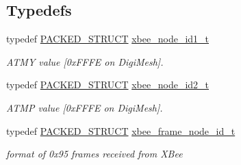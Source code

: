\subsection*{Typedefs}
\begin{DoxyCompactItemize}
\item 
typedef \hyperlink{group___s_x_a_ga4233297bd31be5c273d4fb0758cc54d7}{P\+A\+C\+K\+E\+D\+\_\+\+S\+T\+R\+U\+CT} \hyperlink{group__xbee__discovery_gaf00a7a98eff47e084bf5f8741bf41220}{xbee\+\_\+node\+\_\+id1\+\_\+t}
\begin{DoxyCompactList}\small\item\em A\+T\+MY value \mbox{[}0x\+F\+F\+FE on Digi\+Mesh\mbox{]}. \end{DoxyCompactList}\item 
typedef \hyperlink{group___s_x_a_ga4233297bd31be5c273d4fb0758cc54d7}{P\+A\+C\+K\+E\+D\+\_\+\+S\+T\+R\+U\+CT} \hyperlink{group__xbee__discovery_ga4c7c2f1049e4dc4bb4552269077cf4fc}{xbee\+\_\+node\+\_\+id2\+\_\+t}
\begin{DoxyCompactList}\small\item\em A\+T\+MP value \mbox{[}0x\+F\+F\+FE on Digi\+Mesh\mbox{]}. \end{DoxyCompactList}\item 
typedef \hyperlink{group___s_x_a_ga4233297bd31be5c273d4fb0758cc54d7}{P\+A\+C\+K\+E\+D\+\_\+\+S\+T\+R\+U\+CT} \hyperlink{group__xbee__discovery_ga6343d5dfdcee86d1d294b1bafb8d6f23}{xbee\+\_\+frame\+\_\+node\+\_\+id\+\_\+t}
\begin{DoxyCompactList}\small\item\em format of 0x95 frames received from X\+Bee \end{DoxyCompactList}\end{DoxyCompactItemize}
